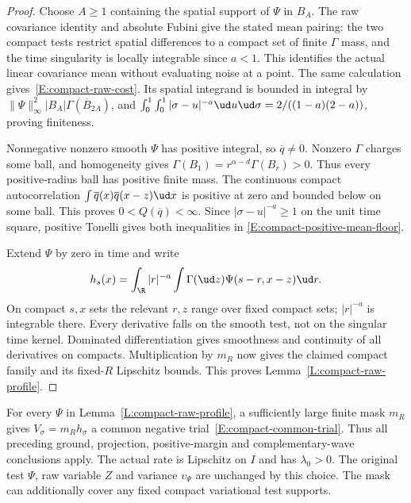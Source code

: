 \begin{proof}
  Choose $A\ge1$ containing the spatial support of $\Psi$ in $B_A$.
  The raw covariance identity and absolute Fubini give the stated
  mean pairing: the two compact tests restrict spatial differences
  to a compact set of finite $\Gamma$ mass, and the time singularity
  is locally integrable since $a<1$. This identifies the actual
  linear covariance mean without evaluating noise at a point.
  The same calculation gives~\eqref{E:compact-raw-cost}.
  Its spatial integrand is bounded in integral by
  $\|\Psi\|_\infty^2|B_A|\Gamma(\overline B_{2A})$,
  and $\int_0^1\int_0^1|\sigma-u|^{-a}\ud u\ud\sigma
  =2/((1-a)(2-a))$, proving finiteness.

  Nonnegative nonzero smooth $\Psi$ has positive integral, so
  $\overline q\ne0$. Nonzero $\Gamma$ charges some ball, and
  homogeneity gives
  $\Gamma(B_1)=r^{\alpha-d}\Gamma(B_r)>0$.
  Thus every positive-radius ball has positive finite mass.
  The continuous compact autocorrelation
  $\int\overline q(x)\overline q(x-z)\ud x$
  is positive at zero and bounded below on some ball.
  This proves $0<Q(\overline q)<\infty$.
  Since $|\sigma-u|^{-a}\ge1$ on the unit time square,
  positive Tonelli gives both inequalities in
  \eqref{E:compact-positive-mean-floor}.

  Extend $\Psi$ by zero in time and write
  \[
    h_s(x)=\int_\R |r|^{-a}
    \int\Gamma(\ud z)\Psi(s-r,x-z)\ud r.
  \]
  On compact $s,x$ sets the relevant $r,z$ range over fixed
  compact sets; $|r|^{-a}$ is integrable there. Every derivative
  falls on the smooth test, not on the singular time kernel.
  Dominated differentiation gives smoothness and continuity of all
  derivatives on compacts. Multiplication by $m_R$ now gives the
  claimed compact family and its fixed-$R$ Lipschitz bounds.
  This proves Lemma~\ref{L:compact-raw-profile}.
\end{proof}

\begin{proposition}
  \label{P:compact-original-common-trial}
  For every $\Psi$ in Lemma~\ref{L:compact-raw-profile}, a sufficiently
  large finite mask $m_R$ gives $V_\sigma=m_Rh_\sigma$ a common
  negative trial~\eqref{E:compact-common-trial}.
  Thus all preceding ground, projection, positive-margin and
  complementary-wave conclusions apply. The actual rate is
  Lipschitz on $I$ and has $\lambda_0>0$.
  The original test $\Psi$, raw variable $Z$ and variance $v_\Psi$
  are unchanged by this choice. The mask can additionally cover any
  fixed compact variational test supports.
\end{proposition}

